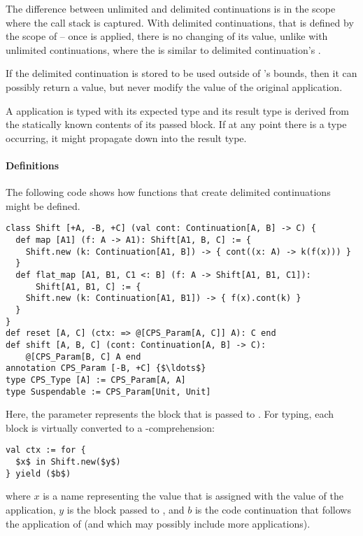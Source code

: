 The difference between unlimited and delimited continuations is in the scope where the call stack is captured. With delimited continuations, that is defined by the scope of  -- once  is applied, there is no changing of its value, unlike with unlimited continuations, where the  is similar to delimited continuation's . 

If the delimited continuation is stored to be used outside of 's bounds, then it can possibly return a value, but never modify the value of the original  application.

A  application is typed with its expected type and its result type is derived from the statically known contents of its passed block. If at any point there is a  type occurring, it might propagate down into the result type. 

\paragraph{Definitions}
The following code shows how functions that create delimited continuations might be defined. 
\begin{lstlisting}
class Shift [+A, -B, +C] (val cont: Continuation[A, B] -> C) {
  def map [A1] (f: A -> A1): Shift[A1, B, C] := {
    Shift.new (k: Continuation[A1, B]) -> { cont((x: A) -> k(f(x))) }
  }
  def flat_map [A1, B1, C1 <: B] (f: A -> Shift[A1, B1, C1]): 
      Shift[A1, B1, C] := {
    Shift.new (k: Continuation[A1, B1]) -> { f(x).cont(k) }
  }
}
def reset [A, C] (ctx: => @[CPS_Param[A, C]] A): C end
def shift [A, B, C] (cont: Continuation[A, B] -> C): 
    @[CPS_Param[B, C] A end
annotation CPS_Param [-B, +C] {$\ldots$}
type CPS_Type [A] := CPS_Param[A, A]
type Suspendable := CPS_Param[Unit, Unit]
\end{lstlisting}

Here, the  parameter represents the block that is passed to . For typing, each  block is virtually converted to a -comprehension:
\begin{lstlisting}
val ctx := for {
  $x$ in Shift.new($y$)
} yield ($b$)
\end{lstlisting}
where $x$ is a name representing the value that is assigned with the value of the  application, $y$ is the block passed to , and $b$ is the code continuation that follows the application of  (and which may possibly include more  applications). 

